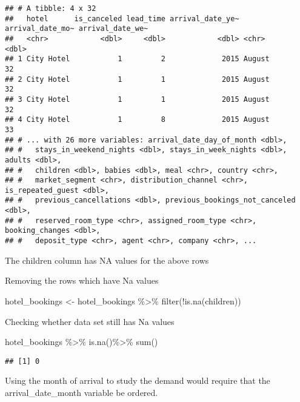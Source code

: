 \documentclass[
]{article}
\newenvironment{Shaded}{\begin{snugshade}}{\end{snugshade}}
\newcommand{\FunctionTok}[1]{\textcolor[rgb]{0.00,0.00,0.00}{#1}}
\newcommand{\NormalTok}[1]{#1}
\newcommand{\OtherTok}[1]{\textcolor[rgb]{0.56,0.35,0.01}{#1}}
\newcommand{\SpecialCharTok}[1]{\textcolor[rgb]{0.00,0.00,0.00}{#1}}
\begin{document}
\begin{verbatim}
## # A tibble: 4 x 32
##   hotel      is_canceled lead_time arrival_date_ye~ arrival_date_mo~ arrival_date_we~
##   <chr>            <dbl>     <dbl>            <dbl> <chr>                       <dbl>
## 1 City Hotel           1         2             2015 August                         32
## 2 City Hotel           1         1             2015 August                         32
## 3 City Hotel           1         1             2015 August                         32
## 4 City Hotel           1         8             2015 August                         33
## # ... with 26 more variables: arrival_date_day_of_month <dbl>,
## #   stays_in_weekend_nights <dbl>, stays_in_week_nights <dbl>, adults <dbl>,
## #   children <dbl>, babies <dbl>, meal <chr>, country <chr>,
## #   market_segment <chr>, distribution_channel <chr>, is_repeated_guest <dbl>,
## #   previous_cancellations <dbl>, previous_bookings_not_canceled <dbl>,
## #   reserved_room_type <chr>, assigned_room_type <chr>, booking_changes <dbl>,
## #   deposit_type <chr>, agent <chr>, company <chr>, ...
\end{verbatim}

The children column has NA values for the above rows

Removing the rows which have Na values

\begin{Shaded}
\begin{Highlighting}[]
\NormalTok{hotel\_bookings }\OtherTok{\textless{}{-}}\NormalTok{ hotel\_bookings }\SpecialCharTok{\%\textgreater{}\%} \FunctionTok{filter}\NormalTok{(}\SpecialCharTok{!}\FunctionTok{is.na}\NormalTok{(children))}
\end{Highlighting}
\end{Shaded}

Checking whether data set still has Na values

\begin{Shaded}
\begin{Highlighting}[]
\NormalTok{hotel\_bookings }\SpecialCharTok{\%\textgreater{}\%} \FunctionTok{is.na}\NormalTok{()}\SpecialCharTok{\%\textgreater{}\%} \FunctionTok{sum}\NormalTok{()}
\end{Highlighting}
\end{Shaded}

\begin{verbatim}
## [1] 0
\end{verbatim}

Using the month of arrival to study the demand would require that the
arrival\_date\_month variable be ordered.
\end{document}
